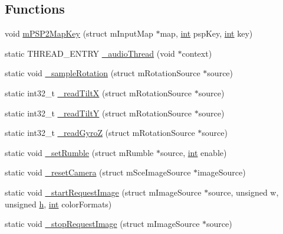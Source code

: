 \subsection*{Functions}
\begin{DoxyCompactItemize}
\item 
void \mbox{\hyperlink{psp2-context_8c_a0ff9569feeb9a2f318792b681331c9ab}{m\+P\+S\+P2\+Map\+Key}} (struct m\+Input\+Map $\ast$map, \mbox{\hyperlink{ioapi_8h_a787fa3cf048117ba7123753c1e74fcd6}{int}} psp\+Key, \mbox{\hyperlink{ioapi_8h_a787fa3cf048117ba7123753c1e74fcd6}{int}} key)
\item 
static T\+H\+R\+E\+A\+D\+\_\+\+E\+N\+T\+RY \mbox{\hyperlink{psp2-context_8c_adba523845bb9885cdad18a6753665635}{\+\_\+audio\+Thread}} (void $\ast$context)
\item 
static void \mbox{\hyperlink{psp2-context_8c_a3759fdba466d4f2b918e28ca2a72e02d}{\+\_\+sample\+Rotation}} (struct m\+Rotation\+Source $\ast$source)
\item 
static int32\+\_\+t \mbox{\hyperlink{psp2-context_8c_a6d9f679bac5e9209e4c39c332067448f}{\+\_\+read\+TiltX}} (struct m\+Rotation\+Source $\ast$source)
\item 
static int32\+\_\+t \mbox{\hyperlink{psp2-context_8c_a483456c7f026a79ac8b6f9f6bb3349e3}{\+\_\+read\+TiltY}} (struct m\+Rotation\+Source $\ast$source)
\item 
static int32\+\_\+t \mbox{\hyperlink{psp2-context_8c_aa764e37dc09625e703361dd3deb193ed}{\+\_\+read\+GyroZ}} (struct m\+Rotation\+Source $\ast$source)
\item 
static void \mbox{\hyperlink{psp2-context_8c_a95b8d13de5bec09567398f90454a054c}{\+\_\+set\+Rumble}} (struct m\+Rumble $\ast$source, \mbox{\hyperlink{ioapi_8h_a787fa3cf048117ba7123753c1e74fcd6}{int}} enable)
\item 
static void \mbox{\hyperlink{psp2-context_8c_a523acbf5391e625edb0e8d8465ff6e51}{\+\_\+reset\+Camera}} (struct m\+Sce\+Image\+Source $\ast$image\+Source)
\item 
static void \mbox{\hyperlink{psp2-context_8c_a4623f2123706c3c47aeed159b0f08e58}{\+\_\+start\+Request\+Image}} (struct m\+Image\+Source $\ast$source, unsigned w, unsigned \mbox{\hyperlink{isa-lr35902_8c_a06a62682361411df32cf88f75a0b8da4}{h}}, \mbox{\hyperlink{ioapi_8h_a787fa3cf048117ba7123753c1e74fcd6}{int}} color\+Formats)
\item 
static void \mbox{\hyperlink{psp2-context_8c_af947cb220342f189826b8c971201d59b}{\+\_\+stop\+Request\+Image}} (struct m\+Image\+Source $\ast$source)
\item 

\end{DoxyCompactItemize}
